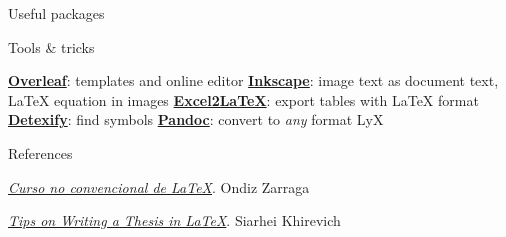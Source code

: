 \begin{frame}{Useful packages}

\end{frame}

\begin{frame}{Tools \& tricks}
 \begin{fullpageitemize}
  \itemR \href{https://www.overleaf.com/}{\textbf{Overleaf}}: templates and online editor
  \itemR \href{http://wiki.inkscape.org/wiki/index.php/LaTeX}{\textbf{Inkscape}}: image text as document text, LaTeX equation in images
  \itemR \href{https://www.ctan.org/tex-archive/support/excel2latex/}{\textbf{Excel2LaTeX}}: export tables with LaTeX format
  \itemR \href{http://detexify.kirelabs.org/classify.html}{\textbf{Detexify}}: find symbols
  \itemR \href{http://pandoc.org/}{\textbf{Pandoc}}: convert to \emph{any} format
  \itemR LyX
\end{fullpageitemize}
 
\end{frame}

\begin{frame}{References}
 \begin{fullpageitemize}
	\itemR\href{https://ondiz.github.io/cursoLatex/}{\emph{Curso no convencional de LaTeX}}. Ondiz Zarraga

	\itemR \href{http://www.khirevich.com/latex/}{\emph{Tips on Writing a Thesis in LaTeX}}. Siarhei Khirevich
 \end{fullpageitemize}
 
\end{frame}

